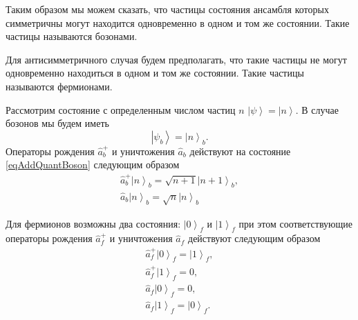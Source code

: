 Таким образом мы можем сказать, что частицы
состояния ансамбля которых симметричны могут находится одновременно в
одном и том же состоянии. Такие частицы называются бозонами.

Для антисимметричного случая будем  
предполагать, что такие частицы не могут одновременно находиться в
одном и том же состоянии. Такие частицы называются фермионами.

Рассмотрим состояние с определенным числом частиц $n$
$\left|\psi\right> = \left|n\right>$. В случае бозонов 
мы будем иметь 
\begin{equation}
\left|\psi_b\right> = \left|n\right>_b.
\label{eqAddQuantBoson}
\end{equation}
Операторы рождения $\hat{a}_b^{+}$ и уничтожения $\hat{a}_b$ действуют на
состояние \eqref{eqAddQuantBoson} следующим образом
\begin{eqnarray}
\hat{a}_b^{+}\left|n\right>_b = \sqrt{n+1}\left|n+1\right>_b, 
\nonumber \\
\hat{a}_b\left|n\right>_b = \sqrt{n}\left|n\right>_b
\nonumber
\end{eqnarray}

Для фермионов  возможны два состояния: $\left|0\right>_f$ и
$\left|1\right>_f$ при этом соответствующие операторы рождения
$\hat{a}_f^{+}$ и уничтожения $\hat{a}_f$ действуют следующим образом
\begin{eqnarray}
\hat{a}_f^{+}\left|0\right>_f = \left|1\right>_f, 
\nonumber \\
\hat{a}_f^{+}\left|1\right>_f = 0, 
\nonumber \\
\hat{a}_f\left|0\right>_f = 0, 
\nonumber \\
\hat{a}_f\left|1\right>_f = \left|0\right>_f.
\nonumber
\end{eqnarray}
